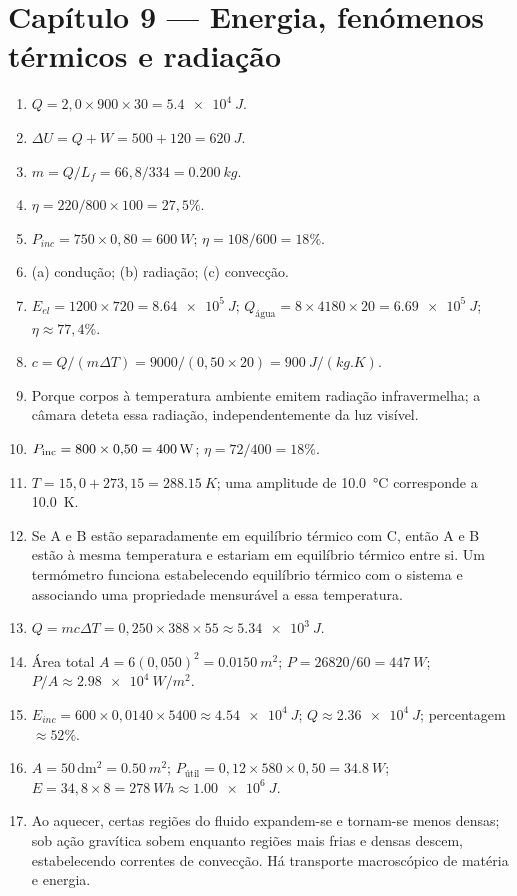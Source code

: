\documentclass[11pt,a4paper,oneside]{book}
\begin{document}
\section*{Capítulo 9 — Energia, fenómenos térmicos e radiação}
\begin{enumerate}
  \item $Q=2{,}0\times900\times30=\SI{5.4e4}{J}$.
  \item $\Delta U=Q+W=500+120=\SI{620}{J}$.
  \item $m=Q/L_f=66{,}8/334=\SI{0.200}{kg}$.
  \item $\eta=220/800\times100=27{,}5\%$.
  \item $P_{inc}=750\times0{,}80=\SI{600}{W}$; $\eta=108/600=18\%$.
  \item (a) condução; (b) radiação; (c) convecção.
  \item $E_{el}=1200\times720=\SI{8.64e5}{J}$; $Q_{\text{água}}=8\times4180\times20=\SI{6.69e5}{J}$; $\eta\approx77{,}4\%$.
  \item $c=Q/(m\Delta T)=9000/(0{,}50\times20)=\SI{900}{J/(kg.K)}$.
  \item Porque corpos à temperatura ambiente emitem radiação infravermelha; a câmara deteta essa radiação, independentemente da luz visível.
  \item $P_{\rm inc}=800\times0{,}50=\SI{400}{W}$; $\eta=72/400=18\%$.
  \item $T=15{,}0+273{,}15=\SI{288.15}{K}$; uma amplitude de \SI{10.0}{\celsius} corresponde a \SI{10.0}{K}.
  \item Se A e B estão separadamente em equilíbrio térmico com C, então A e B estão à mesma temperatura e estariam em equilíbrio térmico entre si. Um termómetro funciona estabelecendo equilíbrio térmico com o sistema e associando uma propriedade mensurável a essa temperatura.
  \item $Q=mc\Delta T=0{,}250\times388\times55\approx\SI{5.34e3}{J}$.
  \item Área total $A=6(0{,}050)^2=\SI{0.0150}{m^2}$; $P=26820/60=\SI{447}{W}$; $P/A\approx\SI{2.98e4}{W/m^2}$.
  \item $E_{inc}=600\times0{,}0140\times5400\approx\SI{4.54e4}{J}$; $Q\approx\SI{2.36e4}{J}$; percentagem $\approx52\%$.
  \item $A=50\,\mathrm{dm^2}=\SI{0.50}{m^2}$; $P_{\text{útil}}=0{,}12\times580\times0{,}50=\SI{34.8}{W}$; $E=34{,}8\times8=\SI{278}{Wh}\approx\SI{1.00e6}{J}$.
  \item Ao aquecer, certas regiões do fluido expandem-se e tornam-se menos densas; sob ação gravítica sobem enquanto regiões mais frias e densas descem, estabelecendo correntes de convecção. Há transporte macroscópico de matéria e energia.
\end{enumerate}
\end{document}
